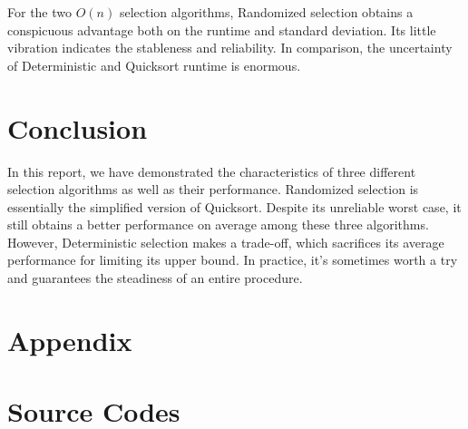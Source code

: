 For the two $O(n)$ selection algorithms, Randomized selection obtains a conspicuous advantage both on the runtime and standard deviation. Its little vibration indicates the stableness and reliability. In comparison, the uncertainty of Deterministic and Quicksort runtime is enormous.


\section{Conclusion}
In this report, we have demonstrated the characteristics of three different selection algorithms as well as their performance. Randomized selection is essentially the simplified version of Quicksort. Despite its unreliable worst case, it still obtains a better performance on average among these three algorithms. However, Deterministic selection makes a trade-off, which sacrifices its average performance for limiting its upper bound. In practice, it's sometimes worth a try and guarantees the steadiness of an entire procedure.

\clearpage
\section{Appendix}
\appendix
\section{Source Codes}
